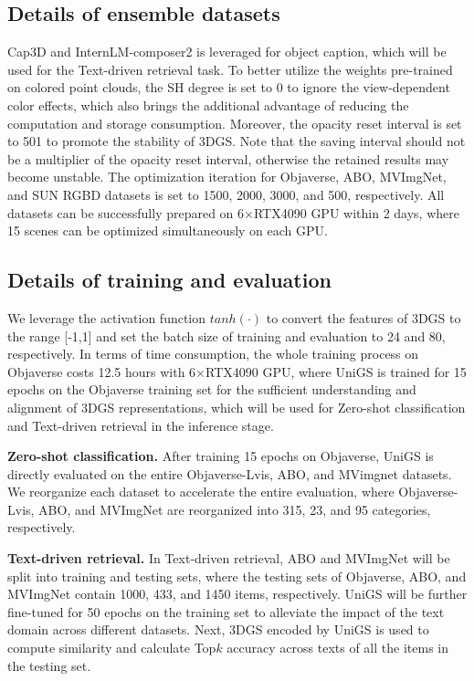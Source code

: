 \subsection{Details of ensemble datasets}
Cap3D\cite{luo2024scalable} and InternLM-composer2\cite{dong2024internlm} is leveraged for object caption, which will be used for the Text-driven retrieval task. To better utilize the weights pre-trained on colored point clouds, the SH degree is set to 0 to ignore the view-dependent color effects, which also brings the additional advantage of reducing the computation and storage consumption. Moreover, the opacity reset interval is set to 501 to promote the stability of 3DGS. Note that the saving interval should not be a multiplier of the opacity reset interval, otherwise the retained results may become unstable. The optimization iteration for Objaverse, ABO, MVImgNet, and SUN RGBD datasets is set to 1500, 2000, 3000, and 500, respectively. All datasets can be successfully prepared on 6$\times$RTX4090 GPU within 2 days, where 15 scenes can be optimized simultaneously on each GPU.

\subsection{Details of training and evaluation}
We leverage the activation function $tanh(\cdot)$ to convert the features of 3DGS to the range [-1,1] and set the batch size of training and evaluation to 24 and 80, respectively. In terms of time consumption, the whole training process on Objaverse costs 12.5 hours with 6$\times$RTX4090 GPU, where UniGS is trained for 15 epochs on the Objaverse training set for the sufficient understanding and alignment of 3DGS representations, which will be used for Zero-shot classification and Text-driven retrieval in the inference stage. 

\textbf{Zero-shot classification. }
After training 15 epochs on Objaverse, UniGS is directly evaluated on the entire Objaverse-Lvis, ABO, and MVimgnet datasets. We reorganize each dataset to accelerate the entire evaluation, where Objaverse-Lvis, ABO, and MVImgNet are reorganized into 315, 23, and 95 categories, respectively.

\textbf{Text-driven retrieval. }
In Text-driven retrieval, ABO and MVImgNet will be split into training and testing sets, where the testing sets of Objaverse, ABO, and MVImgNet contain 1000, 433, and 1450 items, respectively.
UniGS will be further fine-tuned for 50 epochs on the training set to alleviate the impact of the text domain across different datasets. Next, 3DGS encoded by UniGS is used to compute similarity and calculate Top$k$ accuracy across texts of all the items in the testing set.

